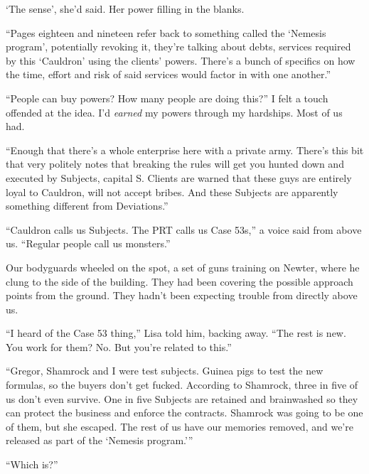`The sense', she'd said.  Her power filling in the blanks.



``Pages eighteen and nineteen refer back to something called the `Nemesis program', potentially revoking it, they're talking about debts, services required by this `Cauldron' using the clients' powers.  There's a bunch of specifics on how the time, effort and risk of said services would factor in with one another.''



``People can buy powers?  How many people are doing this?''  I felt a touch offended at the idea.  I'd \emph{earned} my powers through my hardships.  Most of us had.



``Enough that there's a whole enterprise here with a private army.  There's this bit that very politely notes that breaking the rules will get you hunted down and executed by Subjects, capital S.  Clients are warned that these guys are entirely loyal to Cauldron, will not accept bribes.  And these Subjects are apparently something different from Deviations.''



``Cauldron calls us Subjects.  The PRT calls us Case 53s,'' a voice said from above us.  ``Regular people call us monsters.''



Our bodyguards wheeled on the spot, a set of guns training on Newter, where he clung to the side of the building.  They had been covering the possible approach points from the ground.  They hadn't been expecting trouble from directly above us.



``I heard of the Case 53 thing,'' Lisa told him, backing away.  ``The rest is new.  You work for them?  No.  But you're related to this.''



``Gregor, Shamrock and I were test subjects.  Guinea pigs to test the new formulas, so the buyers don't get fucked.  According to Shamrock, three in five of us don't even survive.  One in five Subjects are retained and brainwashed so they can protect the business and enforce the contracts.  Shamrock was going to be one of them, but she escaped.  The rest of us have our memories removed, and we're released as part of the `Nemesis program.'''



``Which is?''



